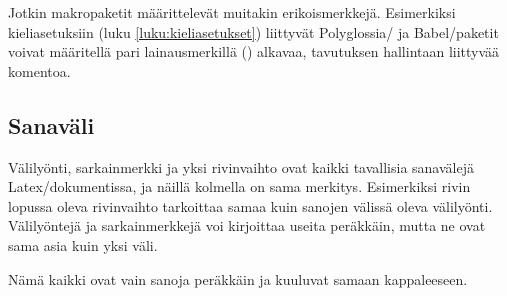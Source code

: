 
Jotkin makropaketit määrittelevät muitakin erikoismerkkejä. Esimerkiksi
kieli\-asetuksiin (luku \ref{luku:kieliasetukset}) liittyvät
Polyglossia\-/{} ja Babel\-/paketit voivat määritellä pari
lainausmerkillä (\koodi{\textquotedbl}) alkavaa, tavutuksen hallintaan
liittyvää komentoa.

\subsection{Sanaväli}
\label{luku:sanavali}

Välilyönti, sarkainmerkki ja yksi rivinvaihto ovat kaikki tavallisia
sanavälejä Latex\-/dokumentissa, ja näillä kolmella on sama merkitys.
Esimerkiksi rivin lopussa oleva rivinvaihto tarkoittaa samaa kuin
sanojen välissä oleva välilyönti. Välilyöntejä ja sarkainmerkkejä voi
kirjoittaa useita peräkkäin, mutta ne ovat sama asia kuin yksi väli.

\begin{koodilohkosis}
  Nämä      kaikki
       ovat            vain
  sanoja  peräkkäin  ja               kuuluvat
      samaan kappaleeseen.     
\end{koodilohkosis}

